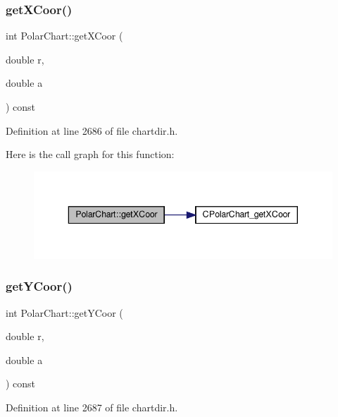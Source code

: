 \subsubsection{\texorpdfstring{get\+X\+Coor()}{getXCoor()}}
{\footnotesize\ttfamily int Polar\+Chart\+::get\+X\+Coor (\begin{DoxyParamCaption}\item[{double}]{r,  }\item[{double}]{a }\end{DoxyParamCaption}) const\hspace{0.3cm}{\ttfamily [inline]}}



Definition at line 2686 of file chartdir.\+h.

Here is the call graph for this function\+:
\nopagebreak
\begin{figure}[H]
\begin{center}
\leavevmode
\includegraphics[width=343pt]{class_polar_chart_a948b023559d129d515adf187526262eb_cgraph}
\end{center}
\end{figure}
\mbox{\label{class_polar_chart_a1f64ec407df2fdd1c80bbc7fd9fb018b}} 
\subsubsection{\texorpdfstring{get\+Y\+Coor()}{getYCoor()}}
{\footnotesize\ttfamily int Polar\+Chart\+::get\+Y\+Coor (\begin{DoxyParamCaption}\item[{double}]{r,  }\item[{double}]{a }\end{DoxyParamCaption}) const\hspace{0.3cm}{\ttfamily [inline]}}



Definition at line 2687 of file chartdir.\+h.

